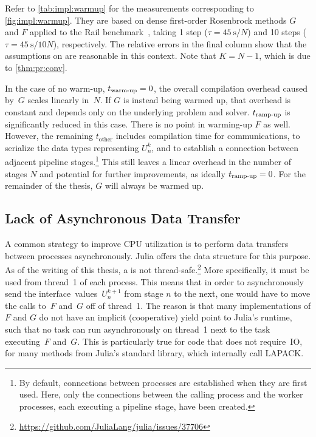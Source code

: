 Refer to \autoref{tab:impl:warmup} for the measurements corresponding to \autoref{fig:impl:warmup}.
They are based on dense first-order Rosenbrock methods $G$ and $F$ applied to the Rail benchmark~\cite{morwiki_steel},
taking 1 step ($\tau=\SI{45}{\second}/N$) and 10 steps ($\tau=\SI{45}{\second}/10N$), respectively.
The relative errors in the final column show that the assumptions on  are reasonable in this context.
Note that $K=N-1$, which is due to \autoref{thm:pr:conv}.

In the case of no warm-up, $t_\text{warm-up}=0$, the overall compilation overhead caused by~$G$ scales linearly in~$N$.
If $G$ is instead being warmed up,
that overhead is constant and depends only on the underlying problem and solver.
$t_\text{ramp-up}$ is significantly reduced in this case.
There is no point in warming-up $F$ as well.
However, the remaining $t_\text{other}$ includes compilation time for communications,
\eg to serialize the data types representing $U_n^k$,
and to establish a connection between adjacent pipeline stages.\footnote{%
  By default, connections between processes are established when they are first used.
  Here, only the connections between the calling process and the worker processes,
  each executing a pipeline stage,
  have been created.
}
This still leaves a linear overhead in the number of stages $N$
and potential for further improvements,
as ideally $t_\text{ramp-up}=0$.
For the remainder of the thesis, $G$ will always be warmed up.

\subsection{Lack of Asynchronous Data Transfer}
\label{sec:impl:pr:sync}

A common strategy to improve CPU utilization is to perform data transfers between processes asynchronously.
Julia offers the  data structure for this purpose.
As of the writing of this thesis,
a  is not thread-safe.\footnote{\url{https://github.com/JuliaLang/julia/issues/37706}}
More specifically, it must be used from thread~1 of each process.
This means that in order to asynchronously send the interface~values~$U_n^{k+1}$ from stage $n$ to the next,
one would have to move the calls to~$F$ and~$G$ off of thread~1.
The reason is that many implementations of $F$ and $G$ do not have an implicit (cooperative) yield point to Julia's runtime,
such that no task can run asynchronously on thread~1 next to the task executing~$F$ and~$G$.
This is particularly true for code that does not require~\ac{IO},
\eg for many methods from Julia's  standard library,
which internally call LAPACK.

